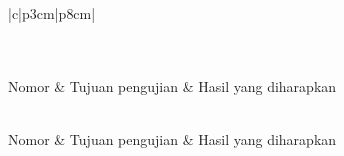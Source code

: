  \begin{longtable}[c]{|c|p{3cm}|p{8cm}|}
	\caption{Tabel Rencana Pengujian}
	\label{tab:rencanapengujian}\\

		\hline
        \\
        \hline
		Nomor & Tujuan pengujian & Hasil yang diharapkan\\
		\hline
		\endfirsthead
        
        \hline
        \\
        \hline
        Nomor & Tujuan pengujian & Hasil yang diharapkan\\
        \hline
        \endhead
        
        \hline
        \endfoot
        
        \hline
        \\
        \hline\hline
        \endlastfoot
        

\end{longtable}
